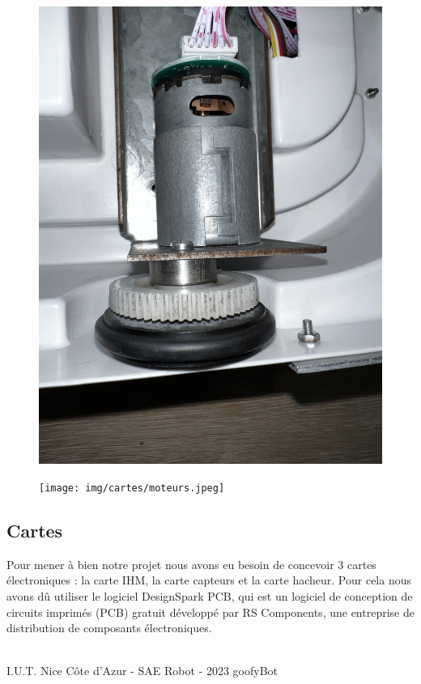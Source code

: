\begin{figure}[H]
\centering
\begin{minipage}{.5\textwidth}
  \centering
  \includegraphics[width=.8\linewidth]{img/cartes/moteur.jpeg}
  \label{fig:moteur}
\end{minipage}%
\begin{minipage}{.5\textwidth}
  \centering
  \texttt{[image: img/cartes/moteurs.jpeg]}
  \label{fig:essieu}
\end{minipage}
\end{figure}

\subsection{Cartes}
Pour mener à bien notre projet nous avons eu besoin de concevoir 3 cartes électroniques : la carte IHM, la carte capteurs et la carte hacheur. Pour cela nous avons dû utiliser le logiciel DesignSpark PCB, qui est un logiciel de conception de circuits imprimés (PCB) gratuit développé par RS Components, une entreprise de distribution de composants électroniques. 

\vfill
\noindent\makebox[\linewidth]{\rule{.8\paperwidth}{.6pt}}\\[0.2cm]
I.U.T. Nice Côte d'Azur - SAE Robot - 2023 \hfill goofyBot
\noindent\makebox[\linewidth]{\rule{.8\paperwidth}{.6pt}}
\newpage


